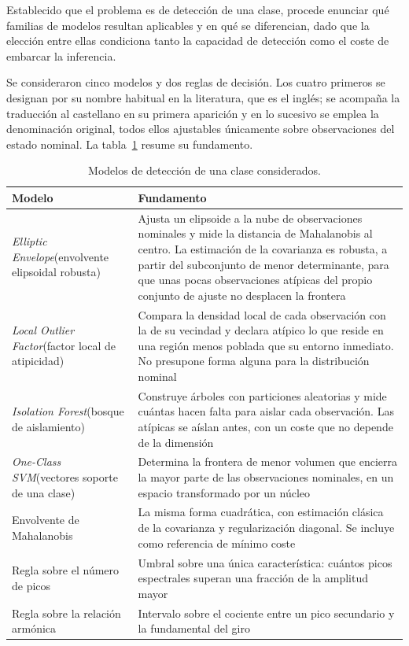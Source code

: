 Establecido que el problema es de detección de una clase, procede enunciar qué familias de
modelos resultan aplicables y en qué se diferencian, dado que la elección entre ellas condiciona
tanto la capacidad de detección como el coste de embarcar la inferencia.

Se consideraron cinco modelos y dos reglas de decisión. Los cuatro primeros se designan por su
nombre habitual en la literatura, que es el inglés; se acompaña la traducción al castellano en
su primera aparición y en lo sucesivo se emplea la denominación original, todos ellos ajustables únicamente sobre
observaciones del estado nominal. La tabla~\ref{table:modelos} resume su fundamento.

\begin{table}[ht!]
\caption{Modelos de detección de una clase considerados.}
\label{table:modelos}
\centering
\begin{tabular}{|p{3.6cm}|p{10.4cm}|}
\hline
\textbf{Modelo} & \textbf{Fundamento} \\
\hline
\textit{Elliptic Envelope}\newline\small(envolvente elipsoidal robusta) & \normalsize Ajusta un elipsoide a la nube de observaciones nominales y mide la
distancia de Mahalanobis al centro. La estimación de la covarianza es robusta, a partir del
subconjunto de menor determinante, para que unas pocas observaciones atípicas del propio
conjunto de ajuste no desplacen la frontera~\cite{rousseeuw1999} \\
\hline
\textit{Local Outlier Factor}\newline\small(factor local de atipicidad) & \normalsize Compara la densidad local de cada observación con la de su
vecindad y declara atípico lo que reside en una región menos poblada que su entorno inmediato.
No presupone forma alguna para la distribución nominal~\cite{breunig2000} \\
\hline
\textit{Isolation Forest}\newline\small(bosque de aislamiento) & \normalsize Construye árboles con particiones aleatorias y mide cuántas hacen falta
para aislar cada observación. Las atípicas se aíslan antes, con un coste que no depende de la
dimensión~\cite{liu2008} \\
\hline
\textit{One-Class SVM}\newline\small(vectores soporte de una clase) & \normalsize Determina la frontera de menor volumen que encierra la mayor
parte de las observaciones nominales, en un espacio transformado por un núcleo~\cite{scholkopf2001} \\
\hline
Envolvente de Mahalanobis & La misma forma cuadrática, con estimación clásica de la covarianza
y regularización diagonal. Se incluye como referencia de mínimo coste \\
\hline
Regla sobre el número de picos & Umbral sobre una única característica: cuántos picos
espectrales superan una fracción de la amplitud mayor \\
\hline
Regla sobre la relación armónica & Intervalo sobre el cociente entre un pico secundario y la
fundamental del giro \\
\hline
\end{tabular}
\end{table}

